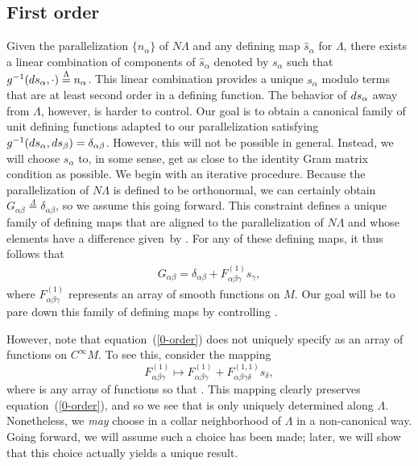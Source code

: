 \documentclass[11pt]{article}
\numberwithin{equation}{section}
\renewcommand{\=}{\stackrel \Lambda =}
\begin{document}
\subsection{First order} \label{fo-Riem}
Given the parallelization $\{n_{\alpha}\}$ of $N \Lambda$ and any defining map $\hat{s}_{\alpha}$ for $\Lambda$, there exists a linear combination of components of $\hat{s}_{\alpha}$ denoted by $s_{\alpha}$ such that $g^{-1}({\rm d}s_{\alpha},\cdot) \= n_{\alpha}$. This linear combination provides a unique $s_{\alpha}$ modulo terms that are at least second order in a defining function. The behavior of ${\rm d}s_{\alpha}$ away from $\Lambda$, however, is harder to control. Our goal is to obtain a canonical family of unit defining functions adapted to our parallelization satisfying $g^{-1}({\rm d}s_{\alpha},{\rm d}s_{\beta}) = \delta_{\alpha \beta}$. However, this will not be possible in general. Instead, we will choose $s_{\alpha}$ to, in some sense, get as close to the identity Gram matrix condition as possible.
We begin with an iterative procedure. Because the parallelization of $N \Lambda$ is defined to be orthonormal, we can certainly obtain $G_{\alpha \beta} \= \delta_{\alpha \beta}$, so we assume this going forward. This constraint defines a unique family of defining maps that are aligned to the parallelization of $N \Lambda$ and whose elements have a difference given~by . For any of these defining maps, it thus follows that
\begin{align} \label{0-order}
G_{\alpha \beta} = \delta_{\alpha \beta} + F^{(1)}_{\alpha \beta \gamma} s_{\gamma} ,
\end{align}
where $F^{(1)}_{\alpha \beta \gamma}$ represents an array of smooth functions on $M$. Our goal will be to pare down this family of defining maps by controlling .

However, note that equation~(\ref{0-order}) does not uniquely specify  as an array of functions on $C^\infty M$. To see this, consider the mapping
\[
F^{(1)}_{\alpha \beta \gamma} \mapsto F^{(1)}_{\alpha \beta \gamma} + F^{(1,1)}_{\alpha \beta \gamma \delta} s_{\delta} ,
\]
where  is any array of functions so that . This mapping clearly preserves equation~(\ref{0-order}), and so we see that  is only uniquely determined along $\Lambda$. Nonetheless, we \textit{may} choose  in a collar neighborhood of $\Lambda$ in a non-canonical way. Going forward, we will assume such a choice has been made; later, we will show that this choice actually yields a unique result.
\end{document}

